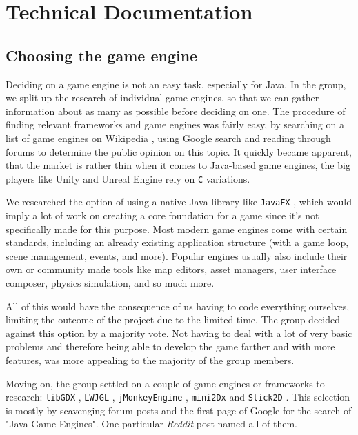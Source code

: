 \documentclass[12p]{article}
\begin{document}

\clearpage
\section{Technical Documentation}

\subsection{Choosing the game engine} \label{DocGameEngine}

Deciding on a game engine is not an easy task, especially for Java. In the group, we split up the research of individual game engines, so that we can gather information about as many as possible before deciding on one. The procedure of finding relevant frameworks and game engines was fairly easy, by searching on a list of game engines on Wikipedia \cite{ListOfGameEngines}, using Google search and reading through forums to determine the public opinion on this topic. It quickly became apparent, that the market is rather thin when it comes to Java-based game engines, the big players like Unity \cite{UnityGameEngine} and Unreal Engine \cite{UnrealEngine} rely on \texttt{C} variations.

We researched the option of using a native Java library like \texttt{JavaFX} \cite{JavaFX}, which would imply a lot of work on creating a core foundation for a game since it's not specifically made for this purpose. Most modern game engines come with certain standards, including an already existing application structure (with a game loop, scene management, events, and more). Popular engines usually also include their own or community made tools like map editors, asset managers, user interface composer, physics simulation, and so much more.

All of this would have the consequence of us having to code everything ourselves, limiting the outcome of the project due to the limited time. The group decided against this option by a majority vote. Not having to deal with a lot of very basic problems and therefore being able to develop the game farther and with more features, was more appealing to the majority of the group members.

Moving on, the group settled on a couple of game engines or frameworks to research: \texttt{libGDX} \cite{LibGDX}, \texttt{LWJGL} \cite{LWJGL}, \texttt{jMonkeyEngine} \cite{jMonkeyEngine}, \texttt{mini2Dx} \cite{mini2Dx} and \texttt{Slick2D} \cite{Slick2D}. This selection is mostly by scavenging forum posts and the first page of Google for the search of "Java Game Engines". One particular \emph{Reddit} post \cite{RedditJavaGameEngines} named all of them.
\end{document}
